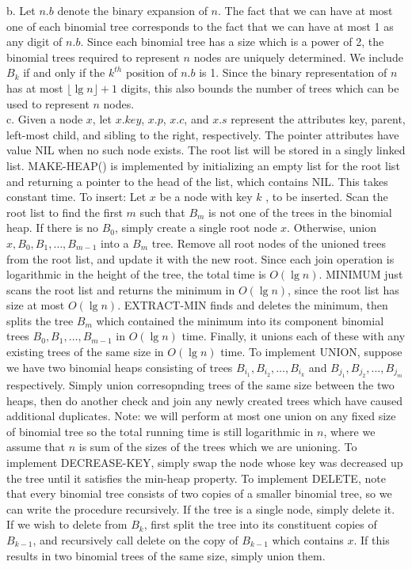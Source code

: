 \documentclass{article}
\begin{document}
b. Let $n.b$ denote the binary expansion of $n$.  The fact that we can have at most one of each binomial tree corresponds to the fact that we can have at most 1 as any digit of $n.b$.  Since each binomial tree has a size which is a power of 2, the binomial trees required to represent $n$ nodes are uniquely determined.  We include $B_k$ if and only if the $k^{th}$ position of $n.b$ is 1.  Since the binary representation of $n$ has at most $\lfloor \lg n \rfloor + 1$ digits, this also bounds the number of trees which can be used to represent $n$ nodes. \\

c. Given a node $x$, let $x.key$, $x.p$, $x.c$, and $x.s$ represent the attributes key, parent, left-most child, and sibling to the right, respectively.  The pointer attributes have value NIL when no such node exists.  The root list will be stored in a singly linked list.  MAKE-HEAP() is implemented by initializing an empty list for the root list and returning a pointer to the head of the list, which contains NIL.  This takes constant time.  To insert: Let $x$ be a node with key $k$ , to be inserted.  Scan the root list to find the first $m$ such that $B_m$ is not one of the trees in the binomial heap.  If there is no $B_0$, simply create a single root node $x$.  Otherwise, union $x, B_0, B_1, \ldots, B_{m-1}$ into a $B_m$ tree.  Remove all root nodes of the unioned trees from the root list, and update it with the new root.  Since each join operation is logarithmic in the height of the tree, the total time is $O(\lg n)$. MINIMUM just scans the root list and returns the minimum in $O(\lg n)$, since the root list has size at most $O(\lg n)$. EXTRACT-MIN finds and deletes the minimum, then splits the tree $B_m$ which contained the minimum into its component binomial trees $B_0, B_1, \ldots, B_{m-1}$ in $O(\lg n)$ time. Finally, it unions each of these with any existing trees of the same size in $O(\lg n)$ time.  To implement UNION, suppose we have two binomial heaps consisting of trees $B_{i_1}, B_{i_2}, \ldots, B_{i_k}$ and $B_{j_1}, B_{j_2}, \ldots, B_{j_m}$ respectively.  Simply union corresopnding trees of the same size between the two heaps, then do another check and join any newly created trees which have caused additional duplicates.  Note: we will perform at most one union on any fixed size of binomial tree so the total running time is still logarithmic in $n$, where we assume that $n$ is sum of the sizes of the trees which we are unioning.  To implement DECREASE-KEY, simply swap the node whose key was decreased up the tree until it satisfies the min-heap property.  To implement DELETE, note that every binomial tree consists of two copies of a smaller binomial tree, so we can write the procedure recursively.  If the tree is a single node, simply delete it.  If we wish to delete from $B_k$, first split the tree into its constituent copies of $B_{k-1}$, and recursively call delete on the copy of $B_{k-1}$ which contains $x$.  If this results in two binomial trees of the same size, simply union them. \\
\end{document}
